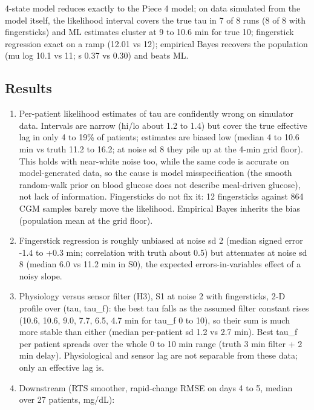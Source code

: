 \documentclass[11pt,a4paper]{article}
\providecommand{\tightlist}{\setlength{\itemsep}{0pt}\setlength{\parskip}{0pt}}
\begin{document}
4-state model reduces exactly to the Piece 4 model; on data simulated
from the model itself, the likelihood interval covers the true tau in 7
of 8 runs (8 of 8 with fingersticks) and ML estimates cluster at 9 to
10.6 min for true 10; fingerstick regression exact on a ramp (12.01 vs
12); empirical Bayes recovers the population (mu log 10.1 vs 11; s 0.37
vs 0.30) and beats ML.

\hypertarget{results}{%
\subsection{Results}\label{results}}

\begin{enumerate}
\def\labelenumi{\arabic{enumi}.}
\tightlist
\item
  Per-patient likelihood estimates of tau are confidently wrong on
  simulator data. Intervals are narrow (hi/lo about 1.2 to 1.4) but
  cover the true effective lag in only 4 to 19\% of patients; estimates
  are biased low (median 4 to 10.6 min vs truth 11.2 to 16.2; at noise
  sd 8 they pile up at the 4-min grid floor). This holds with near-white
  noise too, while the same code is accurate on model-generated data, so
  the cause is model misspecification (the smooth random-walk prior on
  blood glucose does not describe meal-driven glucose), not lack of
  information. Fingersticks do not fix it: 12 fingersticks against 864
  CGM samples barely move the likelihood. Empirical Bayes inherits the
  bias (population mean at the grid floor).
\item
  Fingerstick regression is roughly unbiased at noise sd 2 (median
  signed error -1.4 to +0.3 min; correlation with truth about 0.5) but
  attenuates at noise sd 8 (median 6.0 vs 11.2 min in S0), the expected
  errors-in-variables effect of a noisy slope.
\item
  Physiology versus sensor filter (H3), S1 at noise 2 with fingersticks,
  2-D profile over (tau, tau\_f): the best tau falls as the assumed
  filter constant rises (10.6, 10.6, 9.0, 7.7, 6.5, 4.7 min for tau\_f 0
  to 10), so their sum is much more stable than either (median
  per-patient sd 1.2 vs 2.7 min). Best tau\_f per patient spreads over
  the whole 0 to 10 min range (truth 3 min filter + 2 min delay).
  Physiological and sensor lag are not separable from these data; only
  an effective lag is.
\item
  Downstream (RTS smoother, rapid-change RMSE on days 4 to 5, median
  over 27 patients, mg/dL):
\end{enumerate}
\end{document}
